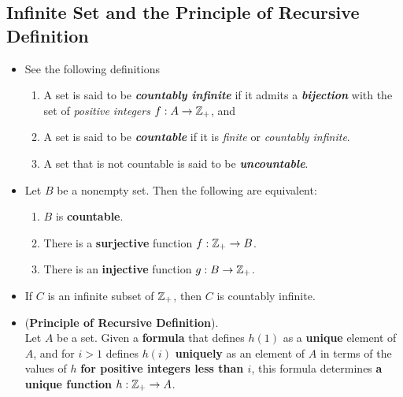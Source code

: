 \documentclass[11pt]{article}
\begin{document}
\subsection{Infinite Set and the Principle of Recursive Definition}
\begin{itemize}
\item \begin{definition} See the following definitions
\begin{enumerate}
\item A set is said to be \emph{\textbf{countably infinite}} if it admits a \emph{\textbf{bijection}} with the set of \emph{positive integers} $f: A \rightarrow {\mathbb Z}_{+}$, and 
\item A set is said to be \emph{\textbf{countable}} if it is \emph{finite} or \emph{countably infinite}. 
\item A set that is not countable is said to be \emph{\textbf{uncountable}}.
\end{enumerate}
\end{definition}

\item \begin{proposition}
Let $B$ be a nonempty set. Then the following are equivalent:
\begin{enumerate}
\item $B$ is \textbf{countable}.
\item There is a \textbf{surjective} function $f: {\mathbb Z}_{+} \rightarrow B$.
\item There is an \textbf{injective} function $g : B  \rightarrow {\mathbb Z}_{+}$.
\end{enumerate}
\end{proposition}

\item \begin{lemma}
If $C$ is an infinite subset of ${\mathbb Z}_{+}$, then $C$ is countably infinite.
\end{lemma}

\item \begin{principle} (\textbf{Principle of Recursive Definition}).  \citep{munkres2000topology} \\
Let $A$ be a set. Given a \textbf{formula} that defines $h(1)$ as a \textbf{unique} element of $A$, and for $i > 1$ defines $h(i)$ \textbf{uniquely} as an element of $A$ in terms of the values of $h$ \textbf{for positive integers less than $i$}, this formula determines \textbf{a unique function} $h: {\mathbb Z}_{+} \rightarrow A$.
\end{principle}


\end{itemize}
\end{document}
